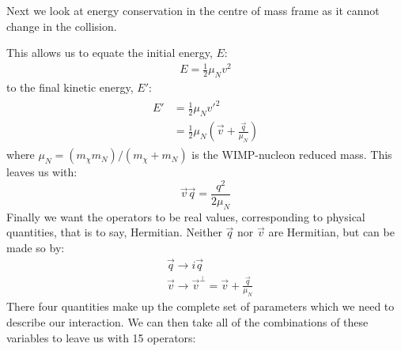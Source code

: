 \par
Next we look at energy conservation in the centre of mass frame as it cannot change in the collision.

This allows us to equate the initial energy, $E$:
\begin{align}
    E  = \frac{1}{2}\mu_N v^2
\end{align}
to the final kinetic energy, $E'$:
\begin{align}
\begin{split}
    E' &= \frac{1}{2}\mu_N v'^2 \\
       &= \frac{1}{2}\mu_N (\vec{v} + \frac{\vec{q}}{\mu_N})
\end{split}
\end{align}
where $\mu_N=(m_\chi m_N)/(m_\chi + m_N)$ is the WIMP-nucleon reduced mass.
This leaves us with:
\begin{equation}
    \vec{v}\vec{q} = \frac{q^2}{2\mu_N}
\end{equation}
Finally we want the operators to be real values, corresponding to physical quantities, that is to say, Hermitian.
Neither $\vec{q}$ nor $\vec{v}$ are Hermitian, but can be made so by:
\begin{equation}
\begin{split}
    &\vec{q} \rightarrow i\vec{q} \\
    &\vec{v} \rightarrow \vec{v}^{\bot} = \vec{v} + \frac{\vec{q}}{\mu_N}
\end{split}
\end{equation}
There four quantities make up the complete set of parameters which we need to describe our interaction.
We can then take all of the combinations of these variables to leave us with 15 operators:
